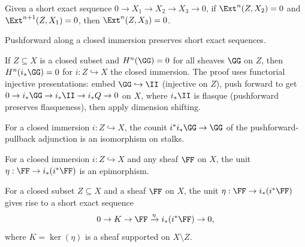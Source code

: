 \begin{lemma}\label{lem:ext_dimension_shift_X3}
  \leanok
  Given a short exact sequence $0 \to X_1 \to X_2 \to X_3 \to 0$,
  if $\Ext^n(Z, X_2) = 0$ and $\Ext^{n+1}(Z, X_1) = 0$,
  then $\Ext^n(Z, X_3) = 0$.
\end{lemma}

\begin{lemma}\label{lem:closedIncl_pushforward_shortExact}
  \leanok
  Pushforward along a closed immersion preserves short exact sequences.
\end{lemma}

\begin{theorem}\label{thm:PushforwardHVanishing}
  \leanok
  If $Z \subseteq X$ is a closed subset and $H^n(\GG) = 0$ for all sheaves $\GG$
  on $Z$, then $H^n(i_* \GG) = 0$ for $i : Z \hookrightarrow X$ the closed immersion.
  The proof uses functorial injective presentations: embed $\GG \hookrightarrow \II$
  (injective on $Z$), push forward to get $0 \to i_*\GG \to i_*\II \to i_*Q \to 0$
  on $X$, where $i_*\II$ is flasque (pushforward preserves flasqueness), then
  apply dimension shifting.
\end{theorem}

\begin{lemma}\label{lem:closedIncl_counit_isIso}
  \leanok
  For a closed immersion $i : Z \hookrightarrow X$, the counit
  $i^* i_* \GG \to \GG$ of the pushforward-pullback adjunction is an isomorphism
  on stalks.
\end{lemma}

\begin{lemma}\label{lem:epi_unit_of_closedImmersion}
  \leanok
  For a closed immersion $i : Z \hookrightarrow X$ and any sheaf $\FF$ on $X$,
  the unit $\eta : \FF \to i_*(i^*\FF)$ is an epimorphism.
\end{lemma}

\begin{theorem}\label{thm:closedImmersionSES}
  \leanok
  For a closed subset $Z \subseteq X$ and a sheaf $\FF$ on $X$, the unit
  $\eta : \FF \to i_*(i^*\FF)$ gives rise to a short exact sequence
  \[
    0 \to K \to \FF \xrightarrow{\eta} i_*(i^*\FF) \to 0,
  \]
  where $K = \ker(\eta)$ is a sheaf supported on $X \setminus Z$.
\end{theorem}


